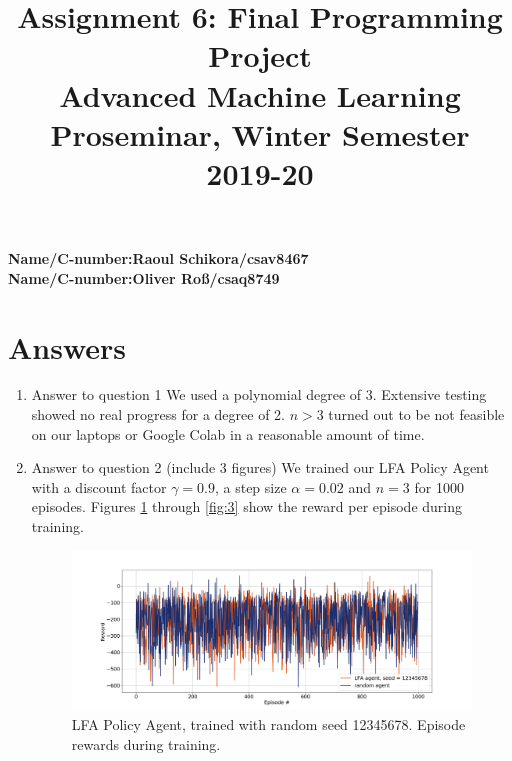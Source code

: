 \documentclass[11pt,a4paper]{article}
\title{\textbf{Assignment 6: Final Programming Project} \\ \Large Advanced Machine Learning Proseminar, Winter Semester 2019-20}
\date{}
\begin{document}
\maketitle

\vspace{-1cm}

\noindent
\textbf{Name/C-number:Raoul Schikora/csav8467}  \\
\textbf{Name/C-number:Oliver Roß/csaq8749}  \\

\section{Answers}

\begin{enumerate}
\item Answer to question 1
	We used a polynomial degree of 3. Extensive testing showed no real progress for a degree of 2. $n>3$ turned out to be not feasible on our laptops or Google Colab in a reasonable amount of time.
\item Answer to question 2 (include 3 figures)
	We trained our LFA Policy Agent with a discount factor $\gamma = 0.9$, a step size $\alpha = 0.02$ and $n = 3$ for 1000 episodes.
	Figures \ref{fig:1} through \ref{fig:3} show the reward per episode during training.
	\begin{figure}
	\begin{center}
		\includegraphics[width = 20cm]{12345678.png}
		\caption{LFA Policy Agent, trained with random seed 12345678. Episode rewards during training.}
		\label{fig:1}
	\end{center}
	\end{figure}


\end{enumerate}
\end{document}
